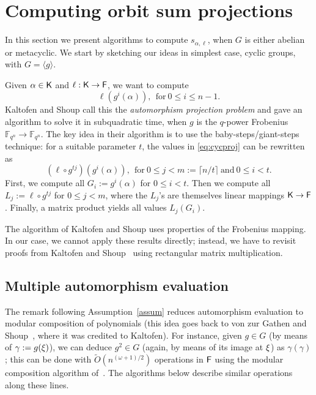 \section{Computing orbit sum projections}
\label{sec:osum}

In this section we present algorithms to compute $s_{\alpha,\ell}$,
when $G$ is either abelian or metacyclic. We start by sketching our
ideas in simplest case, cyclic groups, with $G = \langle g \rangle$. 

Given $\alpha\in{\mathsf{K}}$ and
$\ell:{\mathsf{K}} \to {\mathsf{F}}$, we want to compute
\begin{equation}
  \label{eq:cycproj}
  \ell(g^i(\alpha)), ~~\mbox{for}~ 0\leq i\leq n-1.
\end{equation}
Kaltofen and Shoup  call this the \emph{automorphism projection problem} and
gave an algorithm to solve it in subquadratic time, when $g$ is the
$q$-power Frobenius $\mathbb{F}_{q^n} \to \mathbb{F}_{q^n}$.  The key idea in their
algorithm is to use the baby-steps/giant-steps technique: for a suitable
parameter $t$, the values in \eqref{eq:cycproj} can be rewritten as
\[
  (\ell \circ g^{tj})(g^i(\alpha)), ~~\mbox{for}~ 0 \leq j < m:=\lceil n/t
  \rceil ~\mbox{and}~ 0 \leq i <t.
\]
First, we compute all $G_i:=g^i(\alpha)$ for $0 \leq i <t$.  Then we compute
all $L_j:=\ell \circ g^{tj}$ for $0 \leq j <m$, where the $L_j$'s are
themselves linear mappings ${\mathsf{K}} \to {\mathsf{F}}$.  Finally, a matrix product yields
all values $L_j(G_i)$.

The algorithm of Kaltofen and Shoup  uses properties of the Frobenius
mapping. In our case, we cannot apply
these results directly; instead, we have to revisit proofs
from Kaltofen and Shoup~ using rectangular matrix multiplication.



\subsection{Multiple automorphism evaluation}

The remark following Assumption~\ref{assum} reduces automorphism
evaluation to modular composition of polynomials (this idea goes back to von zur Gathen and Shoup~, where it was credited to
Kaltofen).
For instance, given $g \in G$ (by means of $\gamma:=g(\xi)$), we can
deduce $g^2 \in G$ (again, by means of its image at $\xi$) as
$\gamma(\gamma)$; this can be done with $\tilde{O}(n^{(\omega+1)/2})$
operations in ${\mathsf{F}}$ using the modular composition
algorithm of~\cite{BrKu78}. The algorithms below describe similar operations
along these lines.

